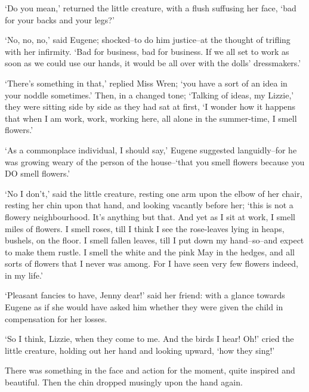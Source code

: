‘Do you mean,’ returned the little creature, with a flush suffusing her
face, ‘bad for your backs and your legs?’

‘No, no, no,’ said Eugene; shocked--to do him justice--at the thought of
trifling with her infirmity. ‘Bad for business, bad for business. If we
all set to work as soon as we could use our hands, it would be all over
with the dolls’ dressmakers.’

‘There’s something in that,’ replied Miss Wren; ‘you have a sort of an
idea in your noddle sometimes.’ Then, in a changed tone; ‘Talking of
ideas, my Lizzie,’ they were sitting side by side as they had sat at
first, ‘I wonder how it happens that when I am work, work, working here,
all alone in the summer-time, I smell flowers.’

‘As a commonplace individual, I should say,’ Eugene suggested
languidly--for he was growing weary of the person of the house--‘that
you smell flowers because you DO smell flowers.’

‘No I don’t,’ said the little creature, resting one arm upon the elbow
of her chair, resting her chin upon that hand, and looking vacantly
before her; ‘this is not a flowery neighbourhood. It’s anything but
that. And yet as I sit at work, I smell miles of flowers. I smell roses,
till I think I see the rose-leaves lying in heaps, bushels, on the
floor. I smell fallen leaves, till I put down my hand--so--and expect to
make them rustle. I smell the white and the pink May in the hedges, and
all sorts of flowers that I never was among. For I have seen very few
flowers indeed, in my life.’

‘Pleasant fancies to have, Jenny dear!’ said her friend: with a glance
towards Eugene as if she would have asked him whether they were given
the child in compensation for her losses.

‘So I think, Lizzie, when they come to me. And the birds I hear! Oh!’
cried the little creature, holding out her hand and looking upward, ‘how
they sing!’

There was something in the face and action for the moment, quite
inspired and beautiful. Then the chin dropped musingly upon the hand
again.

